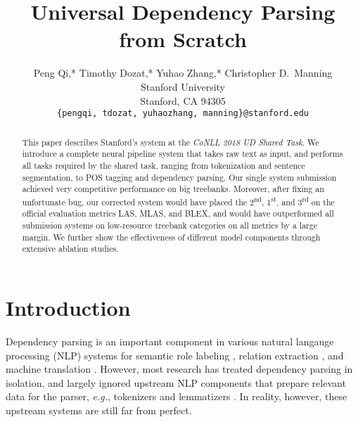 \documentclass[11pt,a4paper]{article}
\title{Universal Dependency Parsing from Scratch}
\author{
Peng Qi,*
Timothy Dozat,*
Yuhao Zhang,*
Christopher D.\ Manning\\
Stanford University\\
Stanford, CA 94305 \\
  {\tt \{pengqi, tdozat, yuhaozhang, manning\}@stanford.edu}
}
\date{}
\begin{document}
\maketitle

\setlength{\abovedisplayskip}{5pt}
\setlength{\belowdisplayskip}{5pt}
\setlength{\abovedisplayshortskip}{0pt}
\setlength{\belowdisplayshortskip}{0pt}

\renewcommand{\thefootnote}{\fnsymbol{footnote}}
\renewcommand{\thefootnote}{\arabic{footnote}}

\newcommand{\udst}[0]{\emph{CoNLL 2018 UD Shared Task}}



\begin{abstract}

This paper describes Stanford's system at the \udst.
We introduce a complete neural pipeline system that takes raw text as input, and performs all tasks required by the shared task, ranging from tokenization and sentence segmentation, to POS tagging and dependency parsing.
Our single system submission achieved very competitive performance on big treebanks.
Moreover, after fixing an unfortunate bug, our corrected system would have placed the 2\textsuperscript{nd}, 1\textsuperscript{st}, and 3\textsuperscript{rd} on the official evaluation metrics LAS, MLAS, and BLEX, and would have outperformed all submission systems on low-resource treebank categories on all metrics by a large margin.
We further show the effectiveness of different model components through extensive ablation studies.













%
 \end{abstract}

\section{Introduction}

Dependency parsing is an important component in various natural langauge processing (NLP) systems for semantic role labeling \cite{marcheggiani2017encoding}, relation extraction \cite{zhang2018graph}, and machine translation
\cite{chen2017improved}.
However, most research has treated dependency parsing in isolation, and largely ignored upstream NLP components that prepare relevant data for the parser, \emph{e.g.}, tokenizers and lemmatizers \cite{udst:overview2017}.
In reality, however, these upstream systems are still far from perfect.
\end{document}
